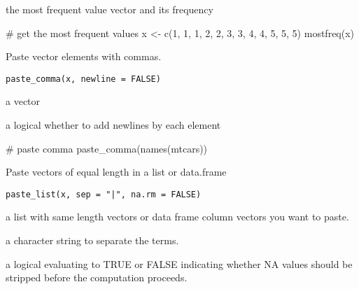 \documentclass[letterpaper]{book}
\begin{document}
%
\begin{Value}
the most frequent value vector and its frequency
\end{Value}
%
\begin{Examples}
\begin{ExampleCode}
# get the most frequent values
x <- c(1, 1, 1, 2, 2, 3, 3, 4, 4, 5, 5, 5)
mostfreq(x)

\end{ExampleCode}
\end{Examples}
%
\begin{Description}
Paste vector elements with commas.
\end{Description}
%
\begin{Usage}
\begin{verbatim}
paste_comma(x, newline = FALSE)
\end{verbatim}
\end{Usage}
%
\begin{Arguments}
\begin{ldescription}
\item[\code{x}] a vector

\item[\code{newline}] a logical whether to add newlines by each element
\end{ldescription}
\end{Arguments}
%
\begin{Examples}
\begin{ExampleCode}
# paste comma
paste_comma(names(mtcars))

\end{ExampleCode}
\end{Examples}
%
\begin{Description}
Paste vectors of equal length in a list or data.frame
\end{Description}
%
\begin{Usage}
\begin{verbatim}
paste_list(x, sep = "|", na.rm = FALSE)
\end{verbatim}
\end{Usage}
%
\begin{Arguments}
\begin{ldescription}
\item[\code{x}] a list with same length vectors or data frame column vectors you want to paste.

\item[\code{sep}] a character string to separate the terms.

\item[\code{na.rm}] a logical evaluating to TRUE or FALSE indicating whether NA values should be stripped before the computation proceeds.
\end{ldescription}
\end{Arguments}
\end{document}
